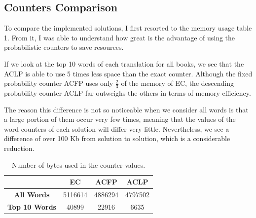 \documentclass[shortpaper]{revdetua}
\begin{document}
\subsection{Counters Comparison}

To compare the implemented solutions, I first resorted to the memory usage table 1.
From it, I was able to understand how great is the advantage of using the 
probabilistic counters to save resources.

If we look at the top 10 words of each translation for all books, we see that 
the ACLP is able to use 5 times less space than the exact counter.
Although the fixed probability counter ACFP uses only $\frac{2}{3}$ of the memory
of EC, the descending probability counter ACLP far outweighs the others in terms
of memory efficiency.

The reason this difference is not so noticeable when we consider all words is 
that a large portion of them occur very few times, meaning that the values of 
the word counters of each solution will differ very little.
Nevertheless, we see a difference of over 100 Kb from solution to solution,
which is a considerable reduction.



\begin{table}[h!]
\centering
\begin{tabular}{@{}c|ccc@{}}
\toprule
                      & \textbf{EC} & \textbf{ACFP} & \textbf{ACLP} \\ \midrule
\textbf{All Words}    & 5116614     & 4886294       & 4797502 \\
\textbf{Top 10 Words} & 40899       & 22916         & 6635    \\ \bottomrule
\end{tabular}
\caption{Number of bytes used in the counter values.}
\end{table}
\vspace{-12pt}
\end{document}
